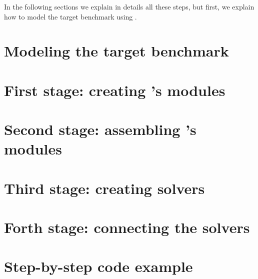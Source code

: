 
In the following sections we explain in details all these steps, but first, we explain how to model the target benchmark using \posl.

\section{Modeling the target benchmark}
\label{sec:model}



\section{First stage: creating \posl's modules}
\label{sec:1ststage}



\section{Second stage: assembling \posl's modules}
\label{sec:2ndstage}



\section{Third stage: creating \posl{} solvers}
\label{sec:3rdstage}



\section{Forth stage: connecting the solvers}
\label{sec:4thstage}



\section{Step-by-step \posl{} code example}

